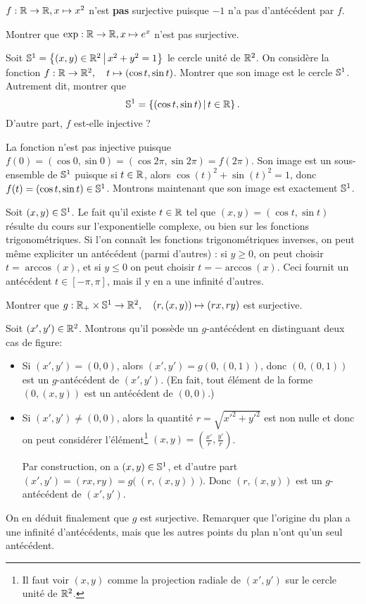 \begin{exemple}
$f : \R\to \R, x\mapsto x^2$ n'est \textbf{pas} surjective puisque $-1$ n'a pas d'antécédent par $f$.
\end{exemple}

\begin{exercice}
Montrer que  $\exp: \R\to \R, x\mapsto e^x$ n'est pas surjective.
\end{exercice}


\begin{exercice}\label{exo-param-cercle}
Soit $\S^1 = \ensemble{(x,y)\in \R^2}{x^2+y^2=1}$ le cercle unité de $\R^2$. On considère la fonction $f : \R\to \R^2, \quad t\mapsto (\cos t, \sin t)$. Montrer que son image est le cercle $\S^1$. Autrement dit, montrer que
\[ \S^1=\ensemble{(\cos t, \sin t)}{t\in \R}.\]
D'autre part, $f$ est-elle injective ?
\end{exercice}
\begin{red}
La fonction n'est pas injective puisque $f(0)=(\cos 0, \sin 0) = (\cos2\pi, \sin 2\pi) = f(2\pi)$. Son image est un sous-ensemble de $\S^1$ puisque si $t\in \R$, alors $\cos(t)^2+\sin(t)^2=1$, donc $f(t)=(\cos t,\sin t) \in \S^1$. Montrons maintenant que son image est exactement $\S^1$.

Soit $(x,y)\in \S^1$. Le fait qu'il existe $t\in \R$ tel que $(x,y)=(\cos t,\sin t) $ résulte du cours sur l'exponentielle complexe, ou bien sur les fonctions trigonométriques. Si l'on connaît les fonctions trigonométriques inverses, on peut même expliciter un antécédent (parmi d'autres) : si $y\geq 0$, on peut choisir $t=\arccos(x)$, et si $y\leq 0$ on peut choisir $t=-\arccos(x)$. Ceci fournit un antécédent $t\in [-\pi,\pi]$, mais il y en a une infinité d'autres.
\end{red}


\begin{exercice}\label{exo-decomp-polaire}
Montrer que $g : \R_+\times \S^1 \to \R^2, \quad (r,(x,y))\mapsto (rx,ry)$ est surjective.
\end{exercice}
\begin{red}
Soit $(x',y')\in \R^2$. Montrons qu'il possède un $g$-antécédent en distinguant deux cas de figure:
\begin{itemize}
\item Si $(x',y')=(0,0)$, alors $(x',y')=g(0,(0,1))$, donc $(0,(0,1))$ est un $g$-antécédent de $(x',y')$. (En fait, tout élément de la forme $(0,(x,y))$ est un antécédent de $(0,0)$.)
\item Si $(x',y')\neq (0,0)$, alors la quantité $r=\sqrt{x'^2+y'^2}$ est non nulle et donc on peut considérer l'élément\footnote{Il faut  voir $(x,y)$ comme la projection radiale de $(x',y')$ sur le cercle unité de $\R^2$.} $(x,y)=\left(\frac{x'}{r},\frac{y'}{r}\right)$.

Par construction, on a $(x,y)\in \S^1$, et d'autre part $(x',y')=(rx,ry)=g\big(\:(r,(x,y))\:\big)$. Donc $(r,(x,y))$ est un $g$-antécédent de $(x',y')$. 
\end{itemize}
On en déduit finalement que $g$ est surjective. Remarquer que l'origine du plan a une infinité d'antécédents, mais que les autres points du plan n'ont qu'un seul antécédent.
\end{red}

